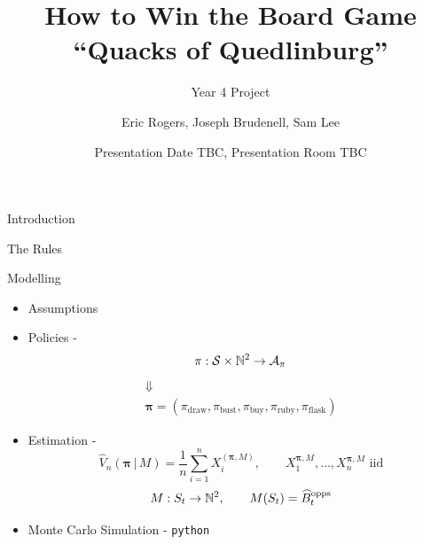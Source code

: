 \documentclass[aspectratio=169,xcolor=dvipsnames]{beamer}
\title[short title]{How to Win the Board Game 
\\``Quacks of Quedlinburg''} %
\subtitle{Year 4 Project}
\author[ER, JB, SL] {Eric Rogers, Joseph Brudenell, Sam Lee}
\institute[UoE] %
{
    The University of Edinburgh %
}
\date{Presentation Date TBC, Presentation Room TBC} %
\begin{document}
\begin{frame}
  \titlepage
\end{frame}



\begin{frame}{Introduction} %
\end{frame}

\begin{frame}{The Rules} %

\end{frame}

\begin{frame}{Modelling} %
\begin{itemize}
    \item Assumptions\pause
    \item Policies - 
    \[
        \pi:\mathcal{S}\times\mathbb{N}^2\to\mathcal{A}_\pi
    \]
    \pause    
    \vspace*{-0.9cm}
    \begin{gather*}
        \Downarrow\\
         \boldsymbol{\pi} = (\pi_{\mathrm{draw}}, \pi_{\mathrm{bust}}, \pi_{\mathrm{buy}}, \pi_{\mathrm{ruby}}, \pi_{\mathrm{flask}})
    \end{gather*}
    \pause
    \item Estimation - 
    \[
        \widehat{V}_n(\boldsymbol{\pi}\,|\,M)=\frac{1}{n}\sum_{i=1}^n X_i^{(\boldsymbol{\pi}, M)},\qquad X_1^{\boldsymbol{\pi}, M},\ldots,X_n^{\boldsymbol{\pi},M}\,\,\text{iid}
    \]
    \pause
    \[
    M:S_t\to\mathbb{N}^2,\qquad M(S_t)=\widehat{B}_t^{\mathrm{opps}}
    \]
    \item Monte Carlo Simulation - \texttt{python}
\end{itemize}
\end{frame}
\end{document}
